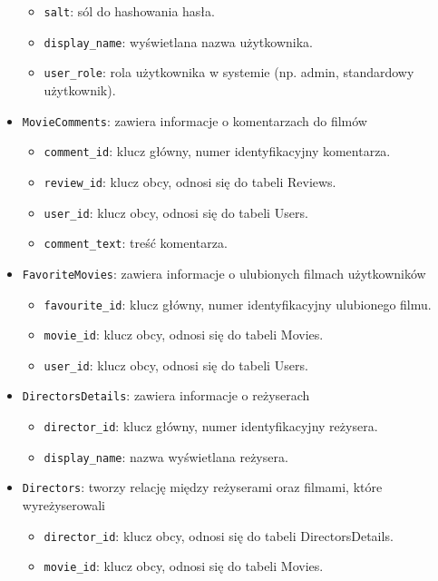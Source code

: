 \documentclass[../main.tex]{subfiles}
\begin{document}
\begin{itemize}
\begin{itemize}
		      \item \texttt{salt}: sól do hashowania hasła.
		      \item \texttt{display\_name}: wyświetlana nazwa użytkownika.
		      \item \texttt{user\_role}: rola użytkownika w systemie (np. admin, standardowy użytkownik).
	      \end{itemize}
	\item \texttt{MovieComments}: zawiera informacje o komentarzach do filmów
	      \begin{itemize}
		      \item \texttt{comment\_id}: klucz główny, numer identyfikacyjny komentarza.
		      \item \texttt{review\_id}: klucz obcy, odnosi się do tabeli Reviews.
		      \item \texttt{user\_id}: klucz obcy, odnosi się do tabeli Users.
		      \item \texttt{comment\_text}: treść komentarza.
	      \end{itemize}
	\item \texttt{FavoriteMovies}: zawiera informacje o ulubionych filmach użytkowników
	      \begin{itemize}
		      \item \texttt{favourite\_id}: klucz główny, numer identyfikacyjny ulubionego filmu.
		      \item \texttt{movie\_id}: klucz obcy, odnosi się do tabeli Movies.
		      \item \texttt{user\_id}: klucz obcy, odnosi się do tabeli Users.
	      \end{itemize}
	\item \texttt{DirectorsDetails}: zawiera informacje o reżyserach
	      \begin{itemize}
		      \item \texttt{director\_id}: klucz główny, numer identyfikacyjny reżysera.
		      \item \texttt{display\_name}: nazwa wyświetlana reżysera.
	      \end{itemize}
	\item \texttt{Directors}: tworzy relację między reżyserami oraz filmami, które wyreżyserowali
	      \begin{itemize}
		      \item \texttt{director\_id}: klucz obcy, odnosi się do tabeli DirectorsDetails.
		      \item \texttt{movie\_id}: klucz obcy, odnosi się do tabeli Movies.

\end{itemize}
\end{itemize}
\end{document}

